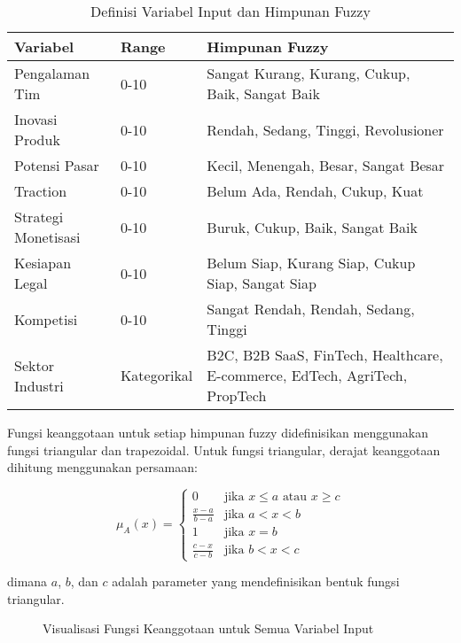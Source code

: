 \documentclass[12pt,a4paper]{article}
\begin{document}
\begin{table}[htbp] %
\centering
\caption{Definisi Variabel Input dan Himpunan Fuzzy}
\label{tab:variables}
\begin{tabular}{@{}lll@{}}
\toprule
\textbf{Variabel} & \textbf{Range} & \textbf{Himpunan Fuzzy} \\
\midrule
Pengalaman Tim & 0-10 & Sangat Kurang, Kurang, Cukup, Baik, Sangat Baik \\
Inovasi Produk & 0-10 & Rendah, Sedang, Tinggi, Revolusioner \\
Potensi Pasar & 0-10 & Kecil, Menengah, Besar, Sangat Besar \\
Traction & 0-10 & Belum Ada, Rendah, Cukup, Kuat \\
Strategi Monetisasi & 0-10 & Buruk, Cukup, Baik, Sangat Baik \\
Kesiapan Legal & 0-10 & Belum Siap, Kurang Siap, Cukup Siap, Sangat Siap \\
Kompetisi & 0-10 & Sangat Rendah, Rendah, Sedang, Tinggi \\
Sektor Industri & Kategorikal & B2C, B2B SaaS, FinTech, Healthcare, E-commerce, EdTech, AgriTech, PropTech \\
\bottomrule
\end{tabular}
\end{table}

Fungsi keanggotaan untuk setiap himpunan fuzzy didefinisikan menggunakan fungsi triangular dan trapezoidal. Untuk fungsi triangular, derajat keanggotaan dihitung menggunakan persamaan:

\begin{equation}
\mu_A(x) = \begin{cases}
0 & \text{jika } x \leq a \text{ atau } x \geq c \\
\frac{x-a}{b-a} & \text{jika } a < x < b \\
1 & \text{jika } x = b \\
\frac{c-x}{c-b} & \text{jika } b < x < c
\end{cases}
\end{equation}

dimana $a$, $b$, dan $c$ adalah parameter yang mendefinisikan bentuk fungsi triangular.

\begin{figure}[htbp] %
    \centering
    \caption{Visualisasi Fungsi Keanggotaan untuk Semua Variabel Input}
    \label{fig:membership}
\end{figure}
\end{document}
